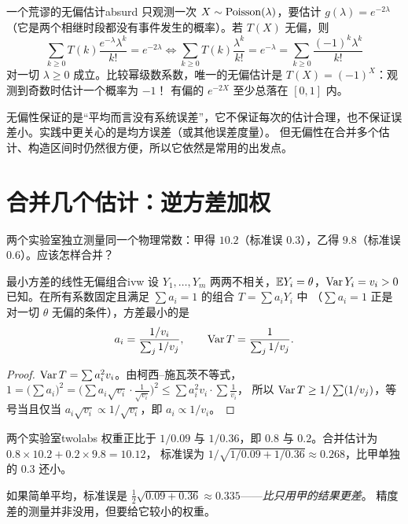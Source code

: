 \begin{example}{一个荒谬的无偏估计}{absurd}
只观测一次 $X\sim\operatorname{Poisson}(\lambda)$，要估计 $g(\lambda)=e^{-2\lambda}$（它是两个相继时段都没有事件发生的概率）。若 $T(X)$ 无偏，则
\[
\sum_{k\ge0}T(k)\frac{e^{-\lambda}\lambda^k}{k!}=e^{-2\lambda}\iff\sum_{k\ge0}T(k)\frac{\lambda^k}{k!}=e^{-\lambda}=\sum_{k\ge0}\frac{(-1)^k\lambda^k}{k!}
\]
对一切 $\lambda\ge0$ 成立。比较幂级数系数，唯一的无偏估计是 $T(X)=(-1)^X$：观测到奇数时估计一个概率为 $-1$！
有偏的 $e^{-2X}$ 至少总落在 $[0,1]$ 内。
\end{example}

\begin{intuition}
无偏性保证的是“平均而言没有系统误差”，它不保证每次的估计合理，也不保证误差小。实践中更关心的是均方误差（或其他误差度量）。
但无偏性在合并多个估计、构造区间时仍然很方便，所以它依然是常用的出发点。
\end{intuition}

\section{合并几个估计：逆方差加权}

两个实验室独立测量同一个物理常数：甲得 $10.2$（标准误 $0.3$），乙得 $9.8$（标准误 $0.6$）。应该怎样合并？

\begin{theorem}{最小方差的线性无偏组合}{ivw}
设 $Y_1,\dots,Y_m$ 两两不相关，$\mathbb{E} Y_i=\theta$，$\operatorname{Var} Y_i=v_i>0$ 已知。在所有系数固定且满足 $\sum a_i=1$ 的组合 $T=\sum a_iY_i$ 中
（$\sum a_i=1$ 正是对一切 $\theta$ 无偏的条件），方差最小的是
\[
a_i=\frac{1/v_i}{\sum_j1/v_j},\qquad \operatorname{Var} T=\frac{1}{\sum_j1/v_j}.
\]
\end{theorem}
\begin{proof}
$\operatorname{Var} T=\sum a_i^2v_i$。由柯西–施瓦茨不等式，
$1=\big(\sum a_i\big)^2=\Big(\sum a_i\sqrt{v_i}\cdot\frac{1}{\sqrt{v_i}}\Big)^2\le\sum a_i^2v_i\cdot\sum\frac1{v_i}$，
所以 $\operatorname{Var} T\ge1/\sum(1/v_j)$，等号当且仅当 $a_i\sqrt{v_i}\propto1/\sqrt{v_i}$，即 $a_i\propto1/v_i$。
\end{proof}

\begin{example}{两个实验室}{twolabs}
权重正比于 $1/0.09$ 与 $1/0.36$，即 $0.8$ 与 $0.2$。合并估计为 $0.8\times10.2+0.2\times9.8=10.12$，
标准误为 $1/\sqrt{1/0.09+1/0.36}\approx0.268$，比甲单独的 $0.3$ 还小。

如果简单平均，标准误是 $\frac12\sqrt{0.09+0.36}\approx0.335$——\emph{比只用甲的结果更差}。
精度差的测量并非没用，但要给它较小的权重。
\end{example}

